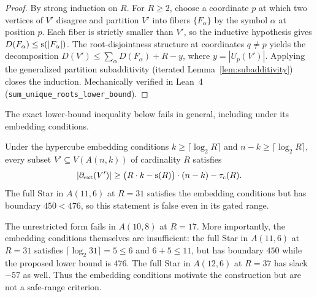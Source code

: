 \begin{proof}
By strong induction on $R$. For $R \ge 2$, choose a coordinate $p$ at which two
vertices of $V'$ disagree and partition $V'$ into fibers $\{F_\alpha\}$ by the
symbol $\alpha$ at position $p$. Each fiber is strictly smaller than $V'$, so
the inductive hypothesis gives $D(F_\alpha) \leq \mathrm{s}(|F_\alpha|)$. The
root-disjointness structure at coordinates $q \neq p$ yields the decomposition
$D(V') \leq \sum_\alpha D(F_\alpha) + R - y$, where $y = |U_p(V')|$. Applying
the generalized partition subadditivity (iterated Lemma~\ref{lem:subadditivity})
closes the induction. Mechanically verified in Lean~4
(\texttt{sum\_unique\_roots\_lower\_bound}).
\end{proof}

The exact lower-bound inequality below fails in general, including under its
embedding conditions.

\begin{proposition}\label{prop:restricted_lower_bound}
	Under the hypercube embedding conditions $k \ge \lceil \log_2 R \rceil$ and
	$n-k \ge \lceil \log_2 R \rceil$, every subset $V' \subseteq V(A(n,k))$ of
	cardinality $R$ satisfies
	\begin{equation}\label{eq:restricted-bound}
		\left|\partial_{\mathrm{ext}}(V')\right| \ge \big(R \cdot k - \mathrm{s}(R)\big) \cdot (n - k) - \tau_{\mathrm{c}}(R).
	\end{equation}
The full Star in $A(11,6)$ at $R=31$ satisfies the embedding conditions but
has boundary $450<476$, so this statement is false even in its gated range.
\end{proposition}

\begin{remark}
The unrestricted form fails in $A(10,8)$ at $R=17$. More importantly, the
embedding conditions themselves are insufficient: the full Star in $A(11,6)$
at $R=31$ satisfies $\lceil\log_2 31\rceil=5\le6$ and $6+5\le11$, but has
boundary $450$ while the proposed lower bound is $476$. The full Star in
$A(12,6)$ at $R=37$ has slack $-57$ as well. Thus the embedding conditions
motivate the construction but are not a safe-range criterion.
\end{remark}

